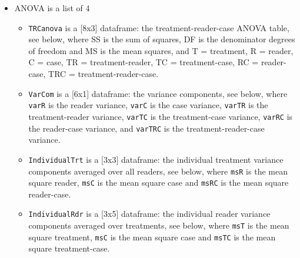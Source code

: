 \documentclass[
]{book}
\newenvironment{Shaded}{\begin{snugshade}}{\end{snugshade}}
\newcommand{\CommentTok}[1]{\textcolor[rgb]{0.56,0.35,0.01}{\textit{#1}}}
\newcommand{\KeywordTok}[1]{\textcolor[rgb]{0.13,0.29,0.53}{\textbf{#1}}}
\newcommand{\NormalTok}[1]{#1}
\newcommand{\OperatorTok}[1]{\textcolor[rgb]{0.81,0.36,0.00}{\textbf{#1}}}
\providecommand{\tightlist}{%
  \setlength{\itemsep}{0pt}\setlength{\parskip}{0pt}}
\begin{document}
\begin{Shaded}
\end{Shaded}

\begin{itemize}
\tightlist
\item
  ANOVA is a list of 4

  \begin{itemize}
  \tightlist
  \item
    \texttt{TRCanova} is a {[}8x3{]} dataframe: the treatment-reader-case ANOVA table, see below, where SS is the sum of squares, DF is the denominator degrees of freedom and MS is the mean squares, and T = treatment, R = reader, C = case, TR = treatment-reader, TC = treatment-case, RC = reader-case, TRC = treatment-reader-case.\\
  \item
    \texttt{VarCom} is a {[}6x1{]} dataframe: the variance components, see below, where \texttt{varR} is the reader variance, \texttt{varC} is the case variance, \texttt{varTR} is the treatment-reader variance, \texttt{varTC} is the treatment-case variance, \texttt{varRC} is the reader-case variance, and \texttt{varTRC} is the treatment-reader-case variance.
  \item
    \texttt{IndividualTrt} is a {[}3x3{]} dataframe: the individual treatment variance components averaged over all readers, see below, where \texttt{msR} is the mean square reader, \texttt{msC} is the mean square case and \texttt{msRC} is the mean square reader-case.
  \item
    \texttt{IndividualRdr} is a {[}3x5{]} dataframe: the individual reader variance components averaged over treatments, see below, where \texttt{msT} is the mean square treatment, \texttt{msC} is the mean square case and \texttt{msTC} is the mean square treatment-case.
  \end{itemize}
\end{itemize}
\end{document}
